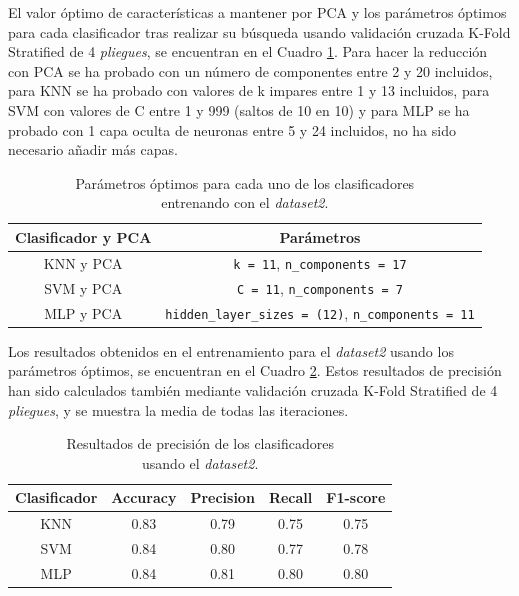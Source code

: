 El valor óptimo de características a mantener por PCA y los parámetros óptimos para cada clasificador tras realizar su búsqueda usando validación cruzada K-Fold Stratified de 4 \textit{pliegues}, se encuentran en el Cuadro \ref{cuadro:parametros_dataset2}. Para hacer la reducción con PCA se ha probado con un número de componentes entre 2 y 20 incluidos, para KNN se ha probado con valores de k impares entre 1 y 13 incluidos, para SVM con valores de C entre 1 y 999 (saltos de 10 en 10) y para MLP se ha probado con 1 capa oculta de neuronas entre 5 y 24 incluidos, no ha sido necesario añadir más capas.\\

\begin{table}[H]
\begin{center}
\begin{tabular}{|c|c|}
     \hline
    \textbf{Clasificador y PCA} & \textbf{Parámetros} \\
    \hline
     KNN y PCA & \verb|k = 11|, \verb|n_components = 17|\\
     SVM y PCA & \verb|C = 11|, \verb|n_components = 7|\\
     MLP y PCA & \verb|hidden_layer_sizes = (12)|, \verb|n_components = 11|\\
     \hline
 \end{tabular}
 \captionsetup{justification=centering}
\caption{Parámetros óptimos para cada uno de los clasificadores\\
entrenando con el \textit{dataset2}.}
\label{cuadro:parametros_dataset2}
\end{center}
\end{table}

Los resultados obtenidos en el entrenamiento para el \textit{dataset2} usando los parámetros óptimos, se encuentran en el Cuadro \ref{cuadro:resultados_dataset2}. Estos resultados de precisión han sido calculados también mediante validación cruzada K-Fold Stratified de 4 \textit{pliegues}, y se muestra la media de todas las iteraciones.\\

\begin{table}[H]
\begin{center}
\begin{tabular}{|c|c|c|c|c|}
     \hline
    \textbf{Clasificador} & \textbf{Accuracy} & \textbf{Precision} & \textbf{Recall} & \textbf{F1-score}\\
    \hline
     KNN & 0.83 & 0.79 & 0.75 & 0.75\\
     SVM & 0.84 & 0.80 & 0.77 & 0.78\\
     MLP & 0.84 & 0.81 & 0.80 & 0.80\\
     \hline
 \end{tabular}
 \captionsetup{justification=centering}
\caption{Resultados de precisión de los clasificadores\\
usando el \textit{dataset2}.}
\label{cuadro:resultados_dataset2}
\end{center}
\end{table}

